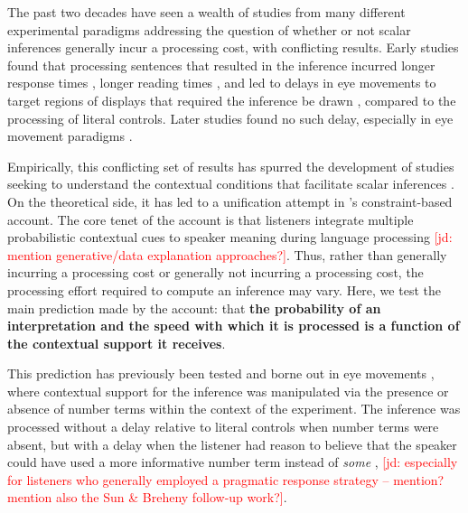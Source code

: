 \documentclass[10pt,letterpaper]{article}
\newcommand{\jd}[1]{\textcolor{Red}{[jd: #1]}}
\begin{document}
The past two decades have seen a wealth of studies from many different experimental paradigms addressing the question of whether or not scalar inferences generally incur a processing cost, with conflicting results. Early studies found that processing sentences that resulted in the inference incurred longer response times \cite{BottNoveck2004, TomlinsonEtAl2012,DegenTanenhaus2015}, longer reading times \cite{BrehenyEtAl2006}, and led to delays in eye movements to target regions of displays that required the inference be drawn \cite{HuangSnedeker2009,HuangSnedeker2011,DegenTanenhaus2016}, compared to the processing of literal controls. Later studies found no such delay, especially in eye movement paradigms \cite{Grodner2010,Breheny2013,DegenTanenhaus2016,SunBreheny2019}. 

Empirically, this conflicting set of results has spurred the development of studies seeking to understand the contextual conditions that facilitate scalar inferences \cite{Zondervan2010,BonnefonEtAl2009,Degen2015,Augurzky2019,MartyChemla2013,DegenGoodman2014,SunBreheny2019}. On the theoretical side, it has led to a unification attempt in 's constraint-based account. The core tenet of the account is that listeners integrate multiple probabilistic contextual cues to speaker meaning during language processing \jd{mention generative/data explanation approaches?}. Thus, rather than generally incurring a processing cost or generally not incurring a processing cost, the processing effort required to compute an inference may vary. Here, we test the main prediction made by the account: that \textbf{the probability of an interpretation and the speed with which it is processed is a function of the contextual support it receives}. 

This prediction has previously been tested and borne out in eye movements \cite{DegenTanenhaus2016}, where contextual support for the inference was manipulated via the presence or absence of number terms within the context of the experiment. The inference was processed without a delay relative to literal controls when number terms were absent, but with a delay when the listener had reason to believe that the speaker could have used a more informative number term instead of \emph{some} \cite{DegenTanenhaus2016}, \jd{especially for listeners who generally employed a pragmatic response strategy -- mention? mention also the Sun \& Breheny follow-up work?}.
\end{document}
